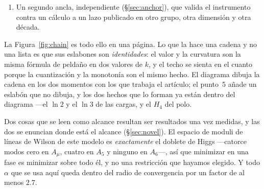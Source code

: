 \documentclass[11pt,a4paper]{article}
\begin{document}
\begin{enumerate}
cero en la brana de los quarks, lo que zanja para el canal gauge la cuestión de la desintegración del
protón que ese artículo deja abierta; la torre coloreada que sobrevive es la del gluón, y como los
quarks están en un punto, actúa a través de la distribución angular de dijets y de un operador en
octete de color que las cotas publicadas de interacción de contacto, enunciadas para uno de
singlete, no restringen \emph{directamente} ---los datos que hay detrás sí, y por eso lo que sigue
es un recast y no un reescalado. Así que se calcula aquí en vez de tomarlo
prestado: el factor de forma espacial de la torre, plegado con densidades partónicas y enfrentado a
la distribución desplegada y la covarianza publicada de \cite{CMSangular}, da $1/R_5>10.86$~TeV
---numéricamente por encima del techo del punto~5, así que los dos cálculos ya se cruzan; ascender
el segundo a cota inferior experimental exige la verosimilitud a nivel de detector, y por eso la
palabra \emph{exclusión} se retiene, por una razón que la \S\ref{sec:collider} enuncia y mide en
vez de agitar. El diccionario está ensamblado con
resultados de otros y así se acredita; lo nuestro es que hay un techo por encima, y una cota
inferior por sí sola nunca habría podido cerrar la clase.
\item Un segundo ancla, independiente (\S\ref{sec:anchor}), que valida el instrumento contra un
cálculo a un lazo publicado en otro grupo, otra dimensión y otra década.
\end{enumerate}

La Figura~\ref{fig:chain} es todo ello en una página. Lo que la hace una cadena y no una lista es
que sus eslabones son \emph{identidades}: el valor y la curvatura son la misma fórmula de peldaño en
dos valores de $k$, y el techo se sienta en el cuanto porque la cuantización y la monotonía son el
mismo hecho. El diagrama dibuja la cadena en los dos momentos con los que trabaja el artículo; el
punto~5 añade un eslabón que no dibuja, y los dos hechos que lo forman ya están dentro del diagrama
---el $\ln2$ y el $\ln3$ de las cargas, y el $H_4$ del polo.

Dos cosas que se leen como alcance resultan ser resultados una vez medidas, y las dos se enuncian
donde está el alcance (\S\ref{sec:novel}). El espacio de moduli de líneas de Wilson de este modelo
es \emph{exactamente} el doblete de Higgs ---catorce modos cero en $A_\mu$, cuatro en $A_5$ y
ninguno en $A_6$---, así que minimizar en una fase es minimizar sobre todo él, y no una restricción
que hayamos elegido. Y todo $\alpha$ que se usa aquí queda dentro del radio de convergencia por un
factor de al menos $2.7$.
\end{document}
